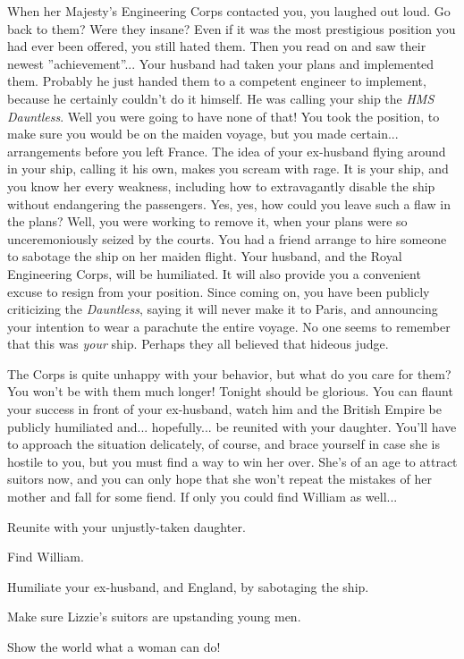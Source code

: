 \documentclass[char]{airship}
\begin{document}
When her Majesty's Engineering Corps contacted you, you laughed out
loud. Go back to them? Were they insane? Even if it was the most
prestigious position you had ever been offered, you still hated
them. Then you read on and saw their newest ''achievement''... Your
husband had taken your plans and implemented them. Probably he just
handed them to a competent engineer to implement, because he certainly
couldn't do it himself. He was calling your ship the {\em HMS
Dauntless}. Well you were going to have none of that! You took the
position, to make sure you would be on the maiden voyage, but you made
certain... arrangements before you left France. The idea of your
ex-husband flying around in your ship, calling it his own, makes you
scream with rage. It is your ship, and you know her every weakness,
including how to extravagantly disable the ship without endangering
the passengers. Yes, yes, how could you leave such a flaw in the
plans?  Well, you were working to remove it, when your plans were so
unceremoniously seized by the courts. You had a friend arrange to hire
someone to sabotage the ship on her maiden flight. Your husband, and
the Royal Engineering Corps, will be humiliated. It will also provide
you a convenient excuse to resign from your position. Since coming on,
you have been publicly criticizing the {\em Dauntless}, saying it
will never make it to Paris, and announcing your intention to wear a
parachute the entire voyage. No one seems to remember that this was
{\em your} ship. Perhaps they all believed that hideous judge.

The Corps is quite unhappy with your behavior, but what do you care
for them? You won't be with them much longer! Tonight should be
glorious.  You can flaunt your success in front of your ex-husband,
watch him and the British Empire be publicly humiliated
and... hopefully... be reunited with your daughter. You'll have to
approach the situation delicately, of course, and brace yourself in
case she is hostile to you, but you must find a way to win her
over. She's of an age to attract suitors now, and you can only hope
that she won't repeat the mistakes of her mother and fall for some
fiend.  If only you could find William as well...


\begin{itemz}[Goals]
  \item Reunite with your unjustly-taken daughter.
  \item Find William.
  \item Humiliate your ex-husband, and England, by sabotaging the ship.
  \item Make sure Lizzie's suitors are upstanding young men.
  \item Show the world what a woman can do!
\end{itemz}
\end{document}
